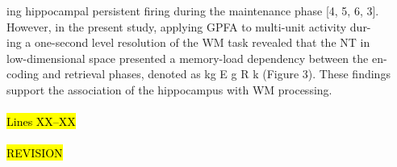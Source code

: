 {ing hippocampal persistent firing during the maintenance phase {[4, 5, 6, 3]}.\\
However, in the present study, applying GPFA to multi-unit activity dur-\\
ing a one-second level resolution of the WM task revealed that the NT in\\
low-dimensional space presented a memory-load dependency between the en-\\
coding and retrieval phases, denoted as kg E g R k (Figure 3). These findings\\
support the association of the hippocampus with WM processing.\\
\\
\hl{
Lines XX--XX\\
\\
REVISION\\
}
}
